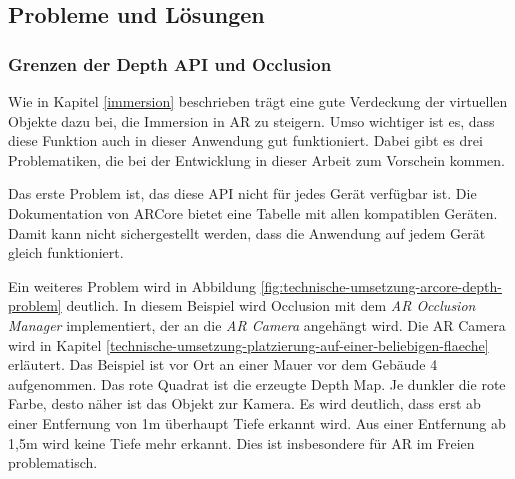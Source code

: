 \subsection{Probleme und Lösungen}
\subsubsection{Grenzen der Depth API und Occlusion}
\label{probleme-grenzen-depth-api}
Wie in Kapitel \ref{immersion} beschrieben trägt eine gute Verdeckung der virtuellen Objekte dazu bei, die Immersion in AR zu steigern\cite*[Breen et al. (1995)][]{breen1995}\cite*[Shah et al. (2012)][]{shah2012}. Umso wichtiger ist es, dass diese Funktion auch in dieser Anwendung gut funktioniert. Dabei gibt es drei Problematiken, die bei der Entwicklung in dieser Arbeit zum Vorschein kommen.

Das erste Problem ist, das diese API nicht für jedes Gerät verfügbar ist. Die Dokumentation von ARCore\cite*{ARCoreDokumentation} bietet eine Tabelle mit allen kompatiblen Geräten. Damit kann nicht sichergestellt werden, dass die Anwendung auf jedem Gerät gleich funktioniert. 

Ein weiteres Problem wird in Abbildung \ref*{fig:technische-umsetzung-arcore-depth-problem} deutlich. In diesem Beispiel wird Occlusion mit dem \textit{AR Occlusion Manager} implementiert, der an die \textit{AR Camera} angehängt wird. Die AR Camera wird in Kapitel \ref*{technische-umsetzung-platzierung-auf-einer-beliebigen-flaeche} erläutert. Das Beispiel ist vor Ort an einer Mauer vor dem Gebäude 4 aufgenommen. Das rote Quadrat ist die erzeugte Depth Map. Je dunkler die rote Farbe, desto näher ist das Objekt zur Kamera. Es wird deutlich, dass erst ab einer Entfernung von 1m überhaupt Tiefe erkannt wird. Aus einer Entfernung ab 1,5m wird keine Tiefe mehr erkannt. Dies ist insbesondere für AR im Freien problematisch. 

